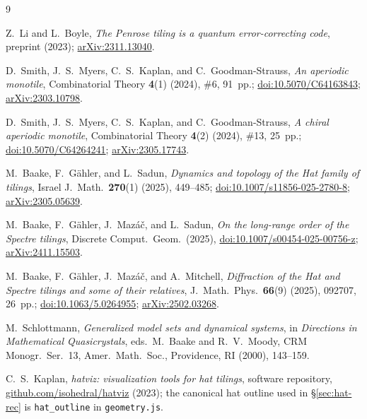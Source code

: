 \documentclass[a4paper,unpublished]{quantumarticle}
\theoremstyle{remark}
\begin{document}
\begin{thebibliography}{9}

Z.~Li and L.~Boyle,
\emph{The Penrose tiling is a quantum error-correcting code},
preprint (2023);
\href{https://arxiv.org/abs/2311.13040}{arXiv:2311.13040}.

D.~Smith, J.~S.~Myers, C.~S.~Kaplan, and C.~Goodman-Strauss,
\emph{An aperiodic monotile},
Combinatorial Theory \textbf{4}(1) (2024), \#6, 91~pp.;
\href{https://doi.org/10.5070/C64163843}{doi:10.5070/C64163843};
\href{https://arxiv.org/abs/2303.10798}{arXiv:2303.10798}.

D.~Smith, J.~S.~Myers, C.~S.~Kaplan, and C.~Goodman-Strauss,
\emph{A chiral aperiodic monotile},
Combinatorial Theory \textbf{4}(2) (2024), \#13, 25~pp.;
\href{https://doi.org/10.5070/C64264241}{doi:10.5070/C64264241};
\href{https://arxiv.org/abs/2305.17743}{arXiv:2305.17743}.

M.~Baake, F.~G\"ahler, and L.~Sadun,
\emph{Dynamics and topology of the Hat family of tilings},
Israel J.\ Math.\ \textbf{270}(1) (2025), 449--485;
\href{https://doi.org/10.1007/s11856-025-2780-8}%
{doi:10.1007/s11856-025-2780-8};
\href{https://arxiv.org/abs/2305.05639}{arXiv:2305.05639}.

M.~Baake, F.~G\"ahler, J.~Maz\'a\v{c}, and L.~Sadun,
\emph{On the long-range order of the Spectre tilings},
Discrete Comput.\ Geom.\ (2025),
\href{https://doi.org/10.1007/s00454-025-00756-z}%
{doi:10.1007/s00454-025-00756-z};
\href{https://arxiv.org/abs/2411.15503}{arXiv:2411.15503}.

M.~Baake, F.~G\"ahler, J.~Maz\'a\v{c}, and A.~Mitchell,
\emph{Diffraction of the Hat and Spectre tilings and some of their
relatives},
J.\ Math.\ Phys.\ \textbf{66}(9) (2025), 092707, 26~pp.;
\href{https://doi.org/10.1063/5.0264955}{doi:10.1063/5.0264955};
\href{https://arxiv.org/abs/2502.03268}{arXiv:2502.03268}.

M.~Schlottmann,
\emph{Generalized model sets and dynamical systems},
in \emph{Directions in Mathematical Quasicrystals},
eds.\ M.~Baake and R.~V.~Moody, CRM Monogr.\ Ser.\ 13,
Amer.\ Math.\ Soc., Providence, RI (2000), 143--159.

C.~S.~Kaplan,
\emph{hatviz: visualization tools for hat tilings},
software repository,
\href{https://github.com/isohedral/hatviz}{github.com/isohedral/hatviz}
(2023); the canonical hat outline used in \S\ref{sec:hat-rec} is
\texttt{hat\_outline} in \texttt{geometry.js}.


\end{thebibliography}
\end{document}
